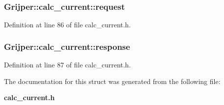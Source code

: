 \subsubsection[{request}]{ Grijper\-::calc\-\_\-current\-::request}\label{structGrijper_1_1calc__current_a777d79026325105672164160b7a146f7}


Definition at line 86 of file calc\-\_\-current.\-h.

\subsubsection[{response}]{ Grijper\-::calc\-\_\-current\-::response}\label{structGrijper_1_1calc__current_aae65d699c34b8eb329f0155d26aaa78e}


Definition at line 87 of file calc\-\_\-current.\-h.



The documentation for this struct was generated from the following file\-:\begin{DoxyCompactItemize}
\item 
{\bf calc\-\_\-current.\-h}\end{DoxyCompactItemize}

